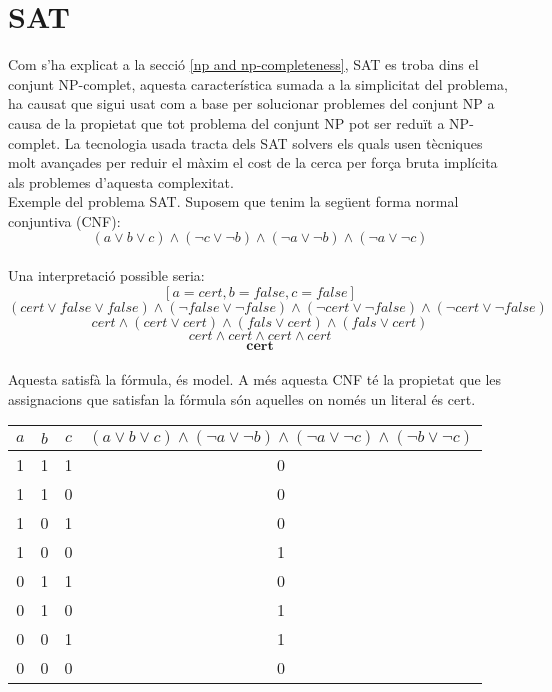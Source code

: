 \section{SAT}
Com s'ha explicat a la secció \ref{np and np-completeness}, SAT es troba dins el conjunt NP-complet, aquesta característica sumada a la simplicitat del problema, ha causat que sigui usat com a base per solucionar problemes del conjunt NP a causa de la propietat que tot problema del conjunt NP pot ser reduït a NP-complet. La tecnologia usada tracta dels SAT solvers els quals usen tècniques molt avançades per reduir el màxim el cost de la cerca per força bruta implícita als problemes d'aquesta complexitat.\\
Exemple del problema SAT.
Suposem que tenim la següent forma normal conjuntiva (CNF):\\
$$(a \lor b \lor c) \land (\lnot c \lor \lnot b) \land (\lnot a \lor \lnot b) \land (\lnot a \lor \lnot c) $$\\
Una interpretació possible seria:\\
$$ [a = cert, b = false, c = false]$$
$$(cert \lor false \lor false) \land (\lnot false \lor \lnot false) \land (\lnot cert \lor \lnot false) \land (\lnot cert \lor \lnot false) $$
$$cert  \land (cert \lor cert) \land (fals \lor cert) \land (fals \lor cert) $$
$$cert \land cert  \land cert \land cert $$
$$\textbf{cert}$$\\
Aquesta satisfà la fórmula, és model. A més aquesta CNF té la propietat que les assignacions que satisfan la fórmula són aquelles on només un literal és cert.\\
\begin{table}
    \centering
    \begin{tabular}{ccc|c}
        $a$ & $b$ & $c$ & $(a \lor b \lor c) \land (\lnot a \lor \lnot b) \land (\lnot a \lor \lnot c) \land (\lnot b \lor \lnot c)$ \\
        \hline
        1 & 1 & 1 & 0 \\
        1 & 1 & 0 & 0 \\
        1 & 0 & 1 & 0 \\
        1 & 0 & 0 & 1 \\
        0 & 1 & 1 & 0 \\
        0 & 1 & 0 & 1 \\
        0 & 0 & 1 & 1 \\
        0 & 0 & 0 & 0 \\
    \end{tabular}
\end{table}



